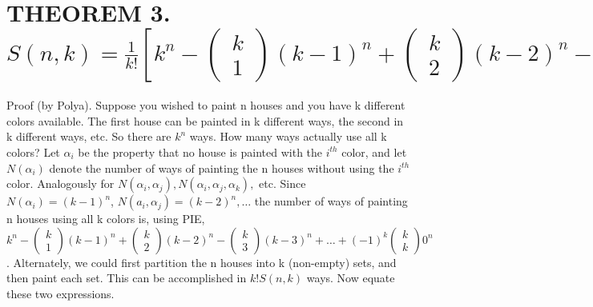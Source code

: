\documentclass{article}
\begin{document}
\section[THEOREM 3.]{THEOREM 3.  $S\left(n,k\right)=\frac
1{k!}\left[k^n-\left(\begin{matrix}k\\1\end{matrix}\right)\left(k-1\right)^n+\left(\begin{matrix}k\\2\end{matrix}\right)\left(k-2\right)^n-\left(\begin{matrix}k\\3\end{matrix}\right)\left(k-3\right)^n+{\dots}+\left(-1\right)^{k-1}\left(\begin{matrix}k\\k-1\end{matrix}\right)1^n\right]$
}
Proof (by Polya). Suppose you wished to paint n houses and you have k different colors available. The first house can be
painted  in k different ways, the second  in k different ways, etc. So there are  $k^n$ ways. How many ways actually
use all k colors? Let  $\alpha _i$ be the property that no house is painted with the  $i^{th}$ color, and let 
$N(\alpha _i)$ denote the number of ways of painting the n houses without using the  $i^{th}$ color. Analogously for 
$N\left(\alpha _i,\alpha _j\right),N\left(\alpha _i,\alpha _j,\alpha _k\right),$ etc. Since   $N\left(\alpha
_i\right)=\left(k-1\right)^n$,  $N\left(a_i,\alpha _j\right)=\left(k-2\right)^n,{\dots}$ the number of ways of painting
n houses using all k colors is, using PIE, 
$k^n-\left(\begin{matrix}k\\1\end{matrix}\right)\left(k-1\right)^n+\left(\begin{matrix}k\\2\end{matrix}\right)\left(k-2\right)^n-\left(\begin{matrix}k\\3\end{matrix}\right)\left(k-3\right)^n+{\dots}+\left(-1\right)^k\left(\begin{matrix}k\\k\end{matrix}\right)0^n$.
Alternately, we could first partition the n houses into k (non-empty) sets, and then paint each set. This can be
accomplished in  $k!S\left(n,k\right)$ ways. Now equate these two expressions. 
\end{document}

